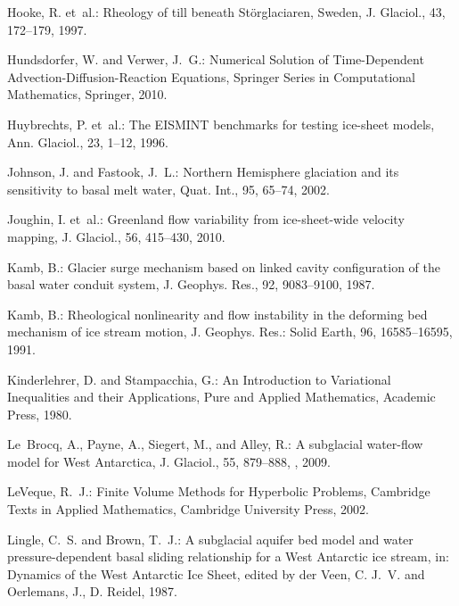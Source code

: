 \documentclass[gmd]{copernicus}   %
\begin{document}
\begin{thebibliography}{}
Hooke, R. et~al.: Rheology of
  till beneath {S}t\"orglaciaren, {S}weden, J. Glaciol., 43, 172--179, 1997.

Hundsdorfer, W. and Verwer, J.~G.: Numerical {S}olution of {T}ime-{D}ependent
  {A}dvection-{D}iffusion-{R}eaction {E}quations, Springer Series in
  Computational Mathematics, Springer, 2010.

Huybrechts, P. et~al.: The {EISMINT} benchmarks for testing ice-sheet models,
  Ann. Glaciol., 23, 1--12, 1996.

Johnson, J. and Fastook, J.~L.: Northern {H}emisphere glaciation and its
  sensitivity to basal melt water, Quat. Int., 95, 65--74, 2002.

Joughin, I. et~al.: Greenland flow variability from ice-sheet-wide velocity
  mapping, J. Glaciol., 56, 415--430, 2010.

Kamb, B.: Glacier surge mechanism based on linked cavity configuration of the
  basal water conduit system, J. Geophys. Res., 92, 9083--9100, 1987.

Kamb, B.: Rheological nonlinearity and flow instability in the deforming bed
  mechanism of ice stream motion, J. Geophys. Res.: Solid Earth, 96, 16585--16595, 1991.

Kinderlehrer, D. and Stampacchia, G.: An {I}ntroduction to {V}ariational
  {I}nequalities and their {A}pplications, Pure and Applied Mathematics,
  Academic Press, 1980.

Le~Brocq, A., Payne, A., Siegert, M., and Alley, R.: A subglacial water-flow
  model for {W}est {A}ntarctica, J. Glaciol., 55, 879--888,
  , 2009.

LeVeque, R.~J.: Finite Volume Methods for Hyperbolic Problems, Cambridge Texts
  in Applied Mathematics, Cambridge University Press, 2002.

Lingle, C.~S. and Brown, T.~J.: A subglacial aquifer bed model and water
  pressure-dependent basal sliding relationship for a {W}est {A}ntarctic ice
  stream, in: Dynamics of the {W}est {A}ntarctic {I}ce {S}heet, edited by der
  Veen, C. J.~V. and Oerlemans, J., D. Reidel, 1987.


\end{thebibliography}
\end{document}
